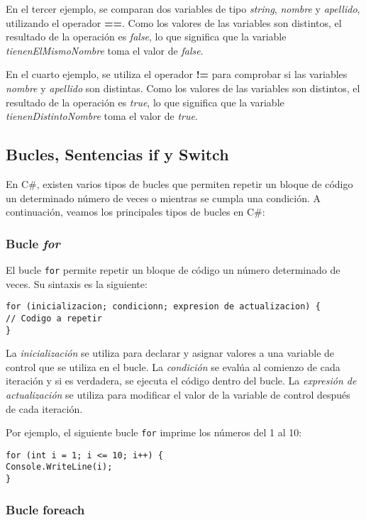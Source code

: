 \documentclass[executivepaper]{article}
\begin{document}
En el tercer ejemplo, se comparan dos variables de tipo \emph{string}, \emph{nombre} y \emph{apellido}, utilizando el operador \textbf{==}. Como los valores de las variables son distintos, el resultado de la operación es \emph{false}, lo que significa que la variable \emph{tienenElMismoNombre} toma el valor de \emph{false}.

En el cuarto ejemplo, se utiliza el operador \textbf{!=} para comprobar si las variables \emph{nombre} y \emph{apellido} son distintas. Como los valores de las variables son distintos, el resultado de la operación es \emph{true}, lo que significa que la variable \emph{tienenDistintoNombre} toma el valor de \emph{true}.

\subsection{Bucles, Sentencias if y Switch}

En C\#, existen varios tipos de bucles que permiten repetir un bloque de código un determinado número de veces o mientras se cumpla una condición. A continuación, veamos los principales tipos de bucles en C\#:

\subsubsection*{Bucle \emph{for}}

El bucle \verb|for| permite repetir un bloque de código un número determinado de veces. Su sintaxis es la siguiente:

\begin{lstlisting}
for (inicializacion; condicionn; expresion de actualizacion) {
// Codigo a repetir
}
\end{lstlisting}

La \emph{inicialización} se utiliza para declarar y asignar valores a una variable de control que se utiliza en el bucle. La \emph{condición} se evalúa al comienzo de cada iteración y si es verdadera, se ejecuta el código dentro del bucle. La \emph{expresión de actualización} se utiliza para modificar el valor de la variable de control después de cada iteración.

Por ejemplo, el siguiente bucle \verb|for| imprime los números del 1 al 10:

\begin{lstlisting}
for (int i = 1; i <= 10; i++) {
Console.WriteLine(i);
}
\end{lstlisting}

\subsubsection*{Bucle foreach}
\end{document}

